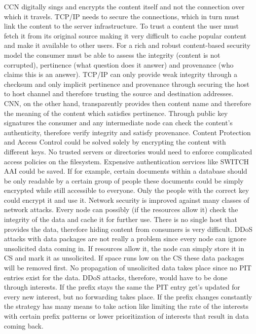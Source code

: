 CCN digitally sings and encrypts the content itself and not the connection over which it travels. TCP/IP needs to secure the connections, which in turn must link the content to the server infrastructure. To trust a content the user must fetch it from its original source making it very difficult to cache popular content and make it available to other users. For a rich and robust content-based security model the consumer must be able to assess the integrity (content is not corrupted), pertinence (what question does it answer) and provenance (who claims this is an answer). TCP/IP can only provide weak integrity through a checksum and only implicit pertinence and provenance through securing the host to host channel and therefore trusting the source and destination addresses. CNN, on the other hand, transparently provides then content name and therefore the meaning of the content which satisfies pertinence. Through public key signatures the consumer and any intermediate node can check the content's authenticity, therefore verify integrity and satisfy provenance.
Content Protection and Access Control could be solved solely by encrypting the content with different keys. No trusted servers or directories would need to enforce complicated access policies on the filesystem. Expensive authentication services like SWITCH AAI could be saved. If for example, certain documents within a database should be only readable by a certain group of people these documents could be simply encrypted while still accessible to everyone. Only the people with the correct key could encrypt it and use it.
Network security is improved against many classes of network attacks. Every node can possibly (if the resources allow it) check the integrity of the data and cache it for further use. There is no single host that provides the data, therefore hiding content from consumers is very difficult.
DDoS attacks with data packages are not really a problem since every node can ignore unsolicited data coming in. If resources allow it, the node can simply store it in CS and mark it as unsolicited. If space runs low on the CS these data packages will be removed first. No propagation of unsolicited data takes place since no PIT entries exist for the data. DDoS attacks, therefore, would have to be done through interests. If the prefix stays the same the PIT entry get's updated for every new interest, but no forwarding takes place. If the prefix changes constantly the strategy has many means to take action like limiting the rate of the interests with certain prefix patterns or lower prioritization of interests that result in data coming back. 

